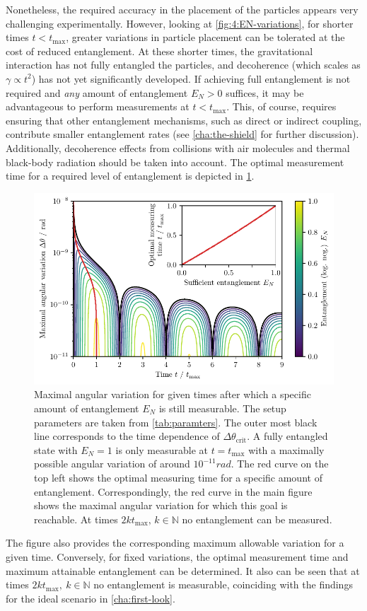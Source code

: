 Nonetheless, the required accuracy in the placement of the particles appears very challenging experimentally.
However, looking at \cref{fig:4:EN-variations}, for shorter times $t<t_\mathrm{max}$, greater variations in particle placement can be tolerated at the cost of reduced entanglement.
At these shorter times, the gravitational interaction has not fully entangled the particles, and decoherence (which scales as $\gamma \propto t^2$) has not yet significantly developed.
If achieving full entanglement is not required and \textit{any} amount of entanglement $E_N > 0$ suffices, it may be advantageous to perform measurements at $t < t_\mathrm{max}$.
This, of course, requires ensuring that other entanglement mechanisms, such as direct or indirect coupling, contribute smaller entanglement rates (see \cref{cha:the-shield} for further discussion).
Additionally, decoherence effects from collisions with air molecules and thermal black-body radiation should be taken into account.
The optimal measurement time for a required level of entanglement is depicted in \cref{fig:4:time-delta-theta}.
\begin{figure}[!htbp]
  \centering
  \includegraphics[width=\textwidth]{./../figures/theta-variance/time-delta-theta-crit-EN.pdf}
  \caption{Maximal angular variation for given times after which a specific amount of entanglement $E_N$ is still measurable. The setup parameters are taken from \cref{tab:paramters}. The outer most black line corresponds to the time dependence of $\Delta \theta_\mathrm{crit}$. A fully entangled state with $E_N=1$ is only measurable at $t=t_\mathrm{max}$ with a maximally possible angular variation of around $10^{-11}\si{rad}$. The red curve on the top left shows the optimal measuring time for a specific amount of entanglement. Correspondingly, the red curve in the main figure shows the maximal angular variation for which this goal is reachable. At times $2k t_\mathrm{max},\,k\in\mathbb{N}$ no entanglement can be measured.}
  \label{fig:4:time-delta-theta}
\end{figure}
The figure also provides the corresponding maximum allowable variation for a given time. Conversely, for fixed variations, the optimal measurement time and maximum attainable entanglement can be determined.
It also can be seen that at times $2k t_\mathrm{max}, \ k\in\mathbb{N}$ no entanglement is measurable, coinciding with the findings for the ideal scenario in \cref{cha:first-look}. 